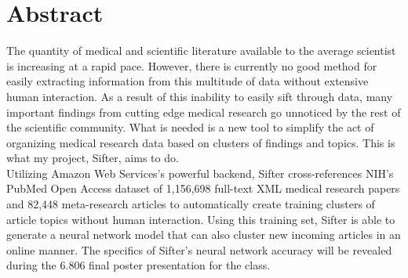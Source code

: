 \documentclass[12pt,twoside]{article}
\begin{document}

\section{Abstract}

The quantity of medical and scientific literature available to the average scientist is increasing at a rapid pace. However, there is currently no good method for easily extracting information from this multitude of data without extensive human interaction. As a result of this inability to easily sift through data, many important findings from cutting edge medical research go unnoticed by the rest of the scientific community. What is needed is a new tool to simplify the act of organizing medical research data based on clusters of findings and topics. This is what my project, Sifter, aims to do.\\

Utilizing Amazon Web Services's powerful backend, Sifter cross-references NIH's PubMed Open Access dataset of 1,156,698 full-text XML medical research papers and 82,448 meta-research articles to automatically create training clusters of article topics without human interaction. Using this training set, Sifter is able to generate a neural network model that can also cluster new incoming articles in an online manner. The specifics of Sifter's neural network accuracy will be revealed during the 6.806 final poster presentation for the class.



\pagebreak

\printbibliography
\end{document}
